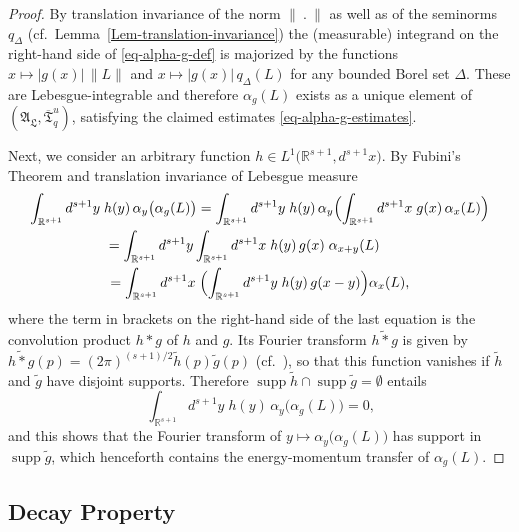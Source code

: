 \documentclass[11pt,twoside,openright]{report}
\theoremstyle{definition}
\theoremstyle{plain}
\theoremstyle{remark}
\theoremstyle{assumption}
\DeclareMathOperator{\supp}{supp}
\newcommand{\abs}[1]{\lvert #1 \rvert}
\newcommand{\norm}[1]{\lVert #1 \rVert}
\newcommand{\qD}{q_\Delta}
\newcommand{\qDx}[1]{q_\Delta ( #1 )}
\newcommand{\Rsone}{\mathbb{R}^{s + 1}}
\newcommand{\Tfrakbar}{\overline{\mathfrak{T}}}
\newcommand{\AL}{\mathfrak{A}_\mathfrak{L}}
\newcommand{\ax}{\alpha_x}
\begin{document}
\begin{proof}
  By translation invariance of the norm $\norm{~.~}$ as well as of the
  seminorms $\qD$ (cf.~Lemma~\ref{Lem-translation-invariance}) the
  (measurable) integrand on the right-hand side of
  \eqref{eq-alpha-g-def} is majorized by the functions $x \mapsto
  \abs{g ( x )} \, \norm{L}$ and $x \mapsto \abs{g ( x )} \, \qDx{L}$
  for any bounded Borel set $\Delta$. These are Lebesgue-integrable
  and therefore $\alpha_g ( L )$ exists as a unique element of $( \AL
  , \Tfrakbar^u_q )$, satisfying the claimed estimates
  \eqref{eq-alpha-g-estimates}.

  Next, we consider an arbitrary function $h \in L^1 \bigl( \Rsone ,
  d^{s + 1} x \bigr)$. By Fubini's Theorem
  \cite[II.16.3]{fell/doran:1988a} and translation invariance of
  Lebesgue measure
  \begin{multline*}
    \int_{\Rsone} d^{s + 1} y \; h ( y ) \, \alpha_y \bigl( \alpha_g (
    L ) \bigr) = \int_{\Rsone} d^{s + 1} y \; h ( y ) \, \alpha_y
    \Bigl( \int_{\Rsone} d^{s + 1} x \; g ( x ) \, \ax ( L ) \Bigr) \\
    \mspace{-40mu} = \int_{\Rsone} d^{s + 1} y \int_{\Rsone} d^{s + 1}
    x \; h ( y ) \, g ( x ) \; \alpha_{x + y} ( L ) \\
    = \int_{\Rsone} d^{s + 1} x \; \Bigl( \int_{\Rsone} d^{s + 1} y \;
    h ( y ) \, g ( x - y ) \Bigr) \ax ( L ) \text{,}
  \end{multline*}
  where the term in brackets on the right-hand side of the last
  equation is the convolution product $h \ast g$ of $h$ and $g$. Its
  Fourier transform $\widetilde{h \ast g}$ is given by $\widetilde{h
  \ast g} ( p ) = ( 2 \pi )^{( s + 1 ) / 2} \tilde{h} ( p ) \tilde{g}
  ( p )$ (cf.~\cite[Theorem~VI.(21.41)]{hewitt/stromberg:1969}), so
  that this function vanishes if $\tilde{h}$ and $\tilde{g}$ have
  disjoint supports. Therefore $\supp \tilde{h} \cap \supp \tilde{g} =
  \emptyset$ entails
  \begin{equation*}
    \int_{\Rsone} d^{s + 1} y \; h ( y ) \, \alpha_y \bigl( \alpha_g (
    L ) \bigr) = 0 \text{,}
  \end{equation*}
  and this shows that the Fourier transform of $y \mapsto \alpha_y
  \bigl( \alpha_g ( L ) \bigr)$ has support in $\supp \tilde{g}$,
  which henceforth contains the energy-momentum transfer of $\alpha_g
  ( L )$.
\end{proof}

\subsection{Decay Property}
\label{subsec-decay-property}
\end{document}
